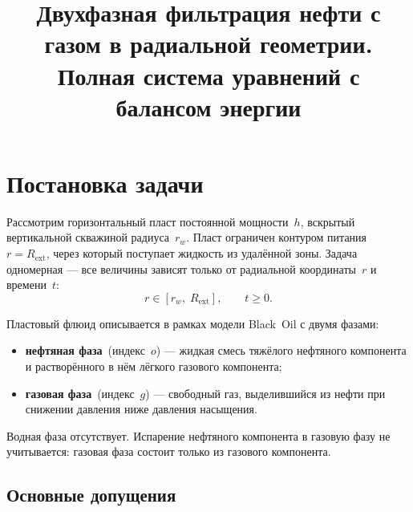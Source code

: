 \documentclass[12pt,a4paper]{article}
\title{Двухфазная фильтрация нефти с газом в радиальной геометрии.\\
Полная система уравнений с балансом энергии}
\author{}
\date{}
\begin{document}
\maketitle
\tableofcontents
\newpage

\section{Постановка задачи}\label{sec:problem}

Рассмотрим горизонтальный пласт постоянной мощности~$h$, вскрытый
вертикальной скважиной радиуса~$r_w$. Пласт ограничен контуром
питания~$r = R_{\mathrm{ext}}$, через который поступает жидкость из
удалённой зоны. Задача одномерная --- все величины зависят только от
радиальной координаты~$r$ и времени~$t$:
\begin{equation}\label{eq:domain}
  r \in [r_w,\; R_{\mathrm{ext}}], \qquad t \geqslant 0.
\end{equation}

Пластовый флюид описывается в рамках модели Black~Oil с двумя фазами:
\begin{itemize}[nosep]
  \item \textbf{нефтяная фаза}~(индекс~$o$) --- жидкая смесь тяжёлого
        нефтяного компонента и растворённого в нём лёгкого газового
        компонента;
  \item \textbf{газовая фаза}~(индекс~$g$) --- свободный газ, выделившийся
        из нефти при снижении давления ниже давления насыщения.
\end{itemize}
Водная фаза отсутствует. Испарение нефтяного компонента в газовую фазу
не учитывается: газовая фаза состоит только из газового компонента.

\subsection{Основные допущения}\label{ssec:assumptions}
\end{document}
